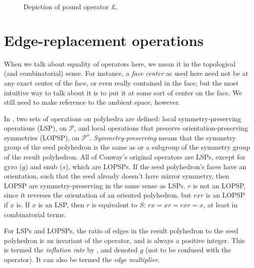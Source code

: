 \documentclass[12pt]{amsart}%
\begin{document}
\begin{figure}[!htbp]

\caption{Depiction of pound operator $\pounds$.}
\label{fig:pound}
\end{figure}

\section{Edge-replacement operations}
When we talk about equality of operators here, we mean it in the topological
(and combinatorial) sense. For instance, a \textit{face center} as used here
need not be at any exact center of the face, or even really contained in the
face, but the most intuitive way to talk about it is to put it at some sort of
center on the face. We still need to make reference to the ambient space,
however.

In \cite{brinkmann}, two sets of operations on polyhedra are defined: local
symmetry-preserving operations (LSP), on $\mathcal{P}$, and local operations
that preserve orientation-preserving symmetries (LOPSP), on $\mathcal{P}^o$.
\textit{Symmetry-preserving} means that the symmetry group of the seed
polyhedron is the same as or a subgroup of the symmetry group of the result
polyhedron. All of Conway's original operators are LSPs,
except for gyro ($g$) and snub ($s$), which are LOPSPs. If the seed
polyhedron's faces have an orientation, such that the seed already doesn't
have mirror symmetry, then LOPSP are symmetry-preserving in the same sense as
LSPs. $r$ is not an LOPSP, since it reverses the orientation of an oriented
polyhedron, but $rxr$ is an LOPSP if $x$ is. If $x$ is an LSP, then $r$ is
equivalent to $S$: $rx = xr = rxr = x$, at least in combinatorial terms.

For LSPs and LOPSPs, the ratio of edges in the result polyhedron to the seed
polyhedron is an invariant of the operator, and is always a positive integer.
This is termed the \textit{inflation rate} by \cite{brinkmann},
and denoted $g$ (not to be confused with the operator).
It can also be termed the \textit{edge multiplier}.
\end{document}
